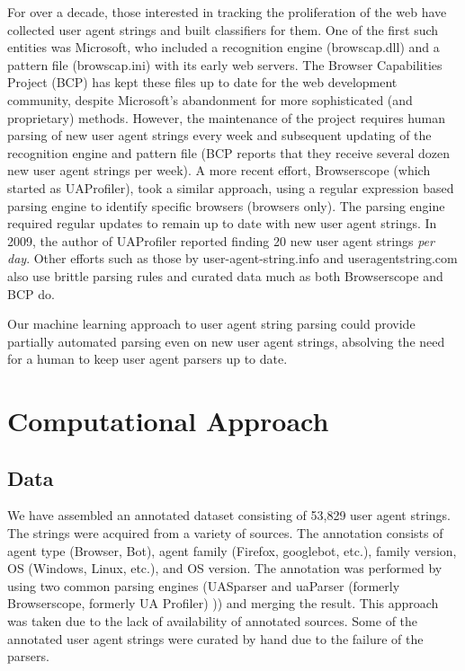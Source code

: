\documentclass[10pt]{article}
\begin{document}
For over a decade, those interested in tracking the proliferation of the web have collected user agent strings and built classifiers for them.  One of the first such entities was Microsoft, who included a recognition engine (browscap.dll) and a pattern file (browscap.ini) with its early web servers.\cite{bcp}  The Browser Capabilities Project (BCP) has kept these files up to date for the web development community, despite Microsoft's abandonment for more sophisticated (and proprietary) methods.\cite{bcp}  However, the maintenance of the project requires human parsing of new user agent strings every week and subsequent updating of the recognition engine and pattern file (BCP reports that they receive several dozen new user agent strings per week).  A more recent effort, Browserscope (which started as UAProfiler), took a similar approach, using a regular expression based parsing engine to identify specific browsers (browsers only). \cite{souders}  The parsing engine required regular updates to remain up to date with new user agent strings.  In 2009, the author of UAProfiler reported finding 20 new user agent strings {\it per day}. \cite{souders2}  Other efforts such as those by user-agent-string.info and useragentstring.com also use brittle parsing rules and curated data much as both Browserscope and BCP do.  \cite{uas.info,uas.com}   

Our machine learning approach to user agent string parsing could provide partially automated parsing even on new user agent strings, absolving the need for a human to keep user agent parsers up to date.      

\section{Computational Approach}
\subsection{Data}
We have assembled an annotated dataset consisting of 53,829 user agent strings.  The strings were acquired from a variety of sources.\cite{ua.org,uatracker,uas.info}  The annotation consists of agent type (Browser, Bot), agent family (Firefox, googlebot, etc.), family version, OS (Windows, Linux, etc.), and OS version.  The annotation was performed by using two common parsing engines (UASparser\cite{uas.info} and uaParser (formerly Browserscope, formerly UA Profiler)\cite{uaParser} )) and merging the result.  This approach was taken due to the lack of availability of annotated sources.  Some of the annotated user agent strings were curated by hand due to the failure of the parsers.
\end{document}
